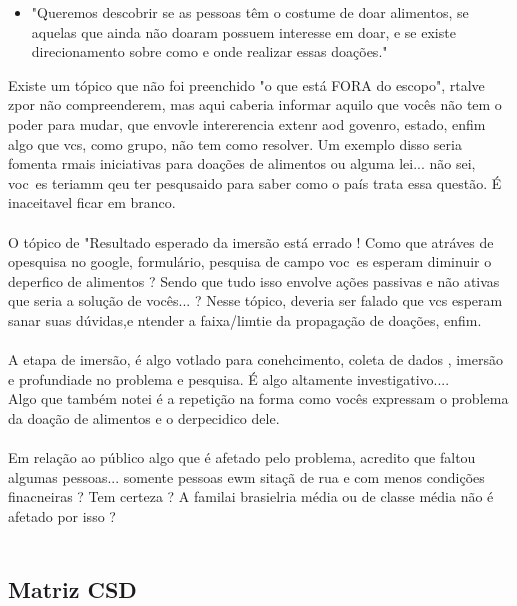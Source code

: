 \documentclass[
  sigconf,
  language=portuguese
]{acmart}
\newcommand{\statuswarn}[1]{{\small\bfseries\color{cwarn}#1}}
\begin{document}
\begin{itemize}[leftmargin=14pt,itemsep=1pt,topsep=3pt]
  \item "Queremos descobrir se as pessoas têm o costume de doar alimentos, se aquelas que ainda não doaram possuem interesse em doar, e se existe direcionamento sobre como e onde realizar essas doações."
\end{itemize}
Existe um tópico que não foi preenchido "o que está FORA do escopo", rtalve zpor não compreenderem, mas aqui caberia informar aquilo que vocês não tem o poder para mudar, que envovle intererencia extenr aod govenro, estado, enfim algo que vcs, como grupo, não tem como resolver. Um exemplo disso seria fomenta rmais iniciativas para doações de alimentos ou alguma lei... não sei, voc~es teriamm qeu ter pesqusaido para saber como o país trata essa questão. É inaceitavel ficar em branco. \\
\\
O tópico de "Resultado esperado da imersão está errado ! Como que atráves de opesquisa no google, formulário, pesquisa de campo voc~es esperam diminuir o deperfico de alimentos ? Sendo que tudo isso envolve ações passivas e não ativas que seria a solução de vocês... ? Nesse tópico, deveria ser falado que vcs esperam sanar suas dúvidas,e ntender a faixa/limtie da propagação de doações, enfim. \\
\\
A etapa de imersão, é algo votlado para conehcimento, coleta de dados , imersão e profundiade no problema e pesquisa. É algo altamente investigativo....\\

Algo que também notei é a repetição na forma como vocês expressam o problema da doação de alimentos e o derpecidico dele.\\
\\
Em relação ao público algo que é afetado pelo problema, acredito que faltou algumas pessoas... somente pessoas ewm sitaçã de rua e com menos condições finacneiras ? Tem certeza ? A familai brasielria média ou de classe média não é afetado por isso ? \\

\\

\subsection{Matriz CSD}

\noindent\statuswarn{0,35\,/\,0,50 pts \textperiodcentered\ Completo, inadequado}
\end{document}
